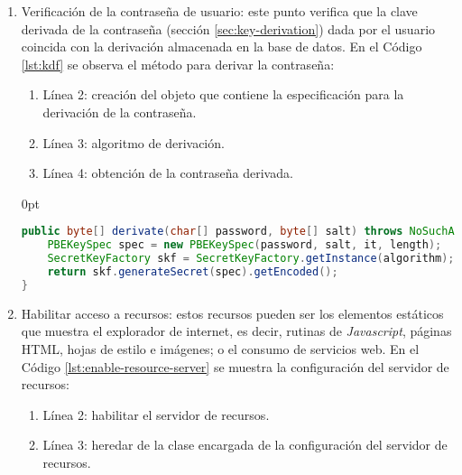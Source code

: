 \begin{enumerate}
\begin{adjustwidth}{\listingfixwidth}{0pt}
\begin{lstlisting}[language=Java, caption={Clase de autentificación de cliente.}, captionpos=b, label={lst:client-auth}]
@Autowired
private EncodedClientDetailsService ecds;

@Override
public void configure(ClientDetailsServiceConfigurer clients) throws Exception{
	BaseClientDetails details = new BaseClientDetails();
	details.setClientId(clientId);
	details.setClientSecret(clientSecret);
	details.setAuthorizedGrantTypes(Arrays.asList("password"));
	ecds.addClientDetails(details);
	clients.withClientDetails(ecds);
}
\end{lstlisting}
\end{adjustwidth}
	\item Verificación de la contraseña de usuario: este punto verifica que la clave derivada de la contraseña (sección \ref{sec:key-derivation}) dada por el usuario coincida con la derivación almacenada en la base de datos. En el Código \ref{lst:kdf} se observa el método para derivar la contraseña:
	\begin{enumerate}
		\item Línea 2: creación del objeto que contiene la especificación para la derivación de la contraseña.
		\item Línea 3: algoritmo de derivación.
		\item Línea 4: obtención de la contraseña derivada.
	\end{enumerate}
\begin{adjustwidth}{\listingfixwidth}{0pt}
\begin{lstlisting}[language=Java, caption={Derivación de la constraseña de usuario.}, captionpos=b, label={lst:kdf}]
public byte[] derivate(char[] password, byte[] salt) throws NoSuchAlgorithmException, InvalidKeySpecException{
	PBEKeySpec spec = new PBEKeySpec(password, salt, it, length);
	SecretKeyFactory skf = SecretKeyFactory.getInstance(algorithm);
	return skf.generateSecret(spec).getEncoded();
}
\end{lstlisting}
\end{adjustwidth}
	\item Habilitar acceso a recursos: estos recursos pueden ser los elementos estáticos que muestra el explorador de internet, es decir, rutinas de \textit{Javascript}, páginas HTML, hojas de estilo e imágenes; o el consumo de servicios web. En el Código \ref{lst:enable-resource-server} se muestra la configuración del servidor de recursos:
	\begin{enumerate}
		\item Línea 2: habilitar el servidor de recursos.
		\item Línea 3: heredar de la clase encargada de la configuración del servidor de recursos.

\end{enumerate}
\end{enumerate}
